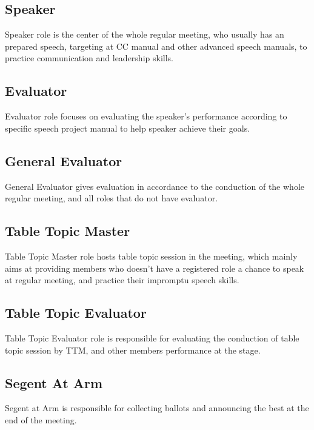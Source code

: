 \subsection{Speaker}

Speaker role is the center of the whole regular meeting, who usually has an 
prepared speech, targeting at CC manual and other advanced speech manuals,
to practice communication and leadership skills.

\subsection{Evaluator}

Evaluator role focuses on evaluating the speaker's performance according to
specific speech project manual to help speaker achieve their goals. 

\subsection{General Evaluator}

General Evaluator gives evaluation in accordance to the conduction of the whole 
regular meeting, and all roles that do not have evaluator.

\subsection{Table Topic Master}

Table Topic Master role hosts table topic session in the meeting, which mainly
aims at providing members who doesn't have a registered role a chance to speak
at regular meeting, and practice their impromptu speech skills.

\subsection{Table Topic Evaluator}

Table Topic Evaluator role is responsible for evaluating the conduction of table
topic session by TTM, and other members performance at the stage.

\subsection{Segent At Arm}

Segent at Arm is responsible for collecting ballots and announcing the best at the
end of the meeting. 


